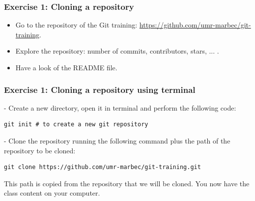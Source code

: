 \documentclass[svgnames]{beamer}
\begin{document}
% 
% 
% 

\begin{frame}
\frametitle{Exercise 1: Cloning a repository}

\begin{itemize}
    \item Go to the repository of the Git training: \url{https://github.com/umr-marbec/git-training}. 
    \item Explore the repository: number of commits, contributors, stars, ... .
    \item Have a look of the README file.
\end{itemize}
\end{frame}


\begin{frame}[fragile]
\frametitle{Exercise 1: Cloning a repository using terminal}

- Create a new directory, open it in terminal and perform the following code:

\begin{lstlisting}
git init # to create a new git repository
\end{lstlisting}

- Clone the repository running the following command plus the path of the repository to be cloned:

\begin{lstlisting}
git clone https://github.com/umr-marbec/git-training.git
\end{lstlisting}

This path is copied from the repository that we will be cloned. You now have the class content on your computer.
\end{frame}


\end{document}
